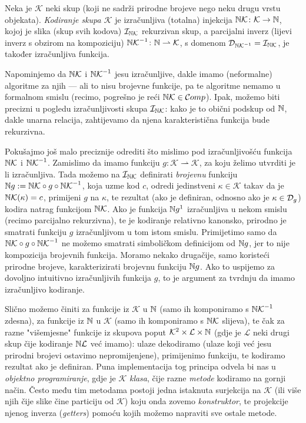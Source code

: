 \begin{definicija}
Neka je $\mathcal K$ neki skup (koji ne sadrži prirodne brojeve nego neku drugu vrstu objekata). \emph{Kodiranje skupa $\mathcal K$} je izračunljiva (totalna) injekcija ${\mathbb N}\mathcal K\colon\mathcal K\to{\mathbb N}$, kojoj je slika (skup svih kodova) $\mathcal I_{{\mathbb N}\mathcal K}$ rekurzivan skup, a parcijalni inverz (lijevi inverz s obzirom na kompoziciju) ${{\mathbb N}\mathcal K}^{-1}\colon{\mathbb N}\rightharpoonup\mathcal K$, s domenom $\mathcal D_{{{\mathbb N}\mathcal K}^{-1}}=\mathcal I_{{\mathbb N}\mathcal K}$, je također izračunljiva funkcija.
\end{definicija}

Napominjemo da ${{\mathbb N}\mathcal K}$ i ${{\mathbb N}\mathcal K}^{-1}$ jesu izračunljive, dakle imamo (neformalne) algoritme za njih --- ali to nisu brojevne funkcije, pa te algoritme nemamo u formalnom smislu (recimo, pogrešno je reći ${\mathbb N}\mathcal K\in\mathcal Comp$). Ipak, možemo biti precizni u pogledu izračunljivosti skupa $\mathcal I_{{\mathbb N}\mathcal K}$: kako je to obični podskup od ${\mathbb N}$, dakle unarna relacija, zahtijevamo da njena karakteristična funkcija bude rekurzivna.

Pokušajmo još malo preciznije odrediti što mislimo pod izračunljivošću funkcija ${{\mathbb N}\mathcal K}$ i ${{\mathbb N}\mathcal K}^{-1}$. Zamislimo da imamo funkciju $g\colon\mathcal K\rightharpoonup\mathcal K$, za koju želimo utvrditi je li izračunljiva. Tada možemo na $\mathcal I_{{\mathbb N}\mathcal K}$ definirati \emph{brojevnu} funkciju ${\mathbb N} g:={{\mathbb N}\mathcal K}\circ g\circ{{\mathbb N}\mathcal K}^{-1}$, koja uzme kod $c$, odredi jedinstveni $\kappa\in\mathcal K$ takav da je ${{\mathbb N}\mathcal K}(\kappa)=c$, primijeni $g$ na $\kappa$, te rezultat (ako je definiran, odnosno ako je $\kappa\in\mathcal D_{g}$) kodira natrag funkcijom ${{\mathbb N}\mathcal K}$. Ako je funkcija ${\mathbb N} g^1$ izračunljiva u nekom smislu (recimo parcijalno rekurzivna), te je kodiranje relativno kanonsko, prirodno je smatrati funkciju $g$ izračunljivom u tom istom smislu. Primijetimo samo da ${{\mathbb N}\mathcal K}\circ g\circ{{\mathbb N}\mathcal K}^{-1}$ ne možemo smatrati simboličkom definicijom od ${\mathbb N} g$, jer to nije kompozicija brojevnih funkcija. Moramo nekako drugačije, samo koristeći prirodne brojeve, karakterizirati brojevnu funkciju ${\mathbb N} g$. Ako to uspijemo za dovoljno intuitivno izračunljivih funkcija $g$, to je argument za tvrdnju da imamo izračunljivo kodiranje.

Slično možemo činiti za funkcije iz $\mathcal K$ u ${\mathbb N}$ (samo ih komponiramo s ${{\mathbb N}\mathcal K}^{-1}$ zdesna), za funkcije iz ${\mathbb N}$ u $\mathcal K$ (samo ih komponiramo s ${{\mathbb N}\mathcal K}$ slijeva), te čak za razne "višemjesne" funkcije iz skupova poput $\mathcal K^2\times \mathcal L\times{\mathbb N}$ (gdje je $\mathcal L$ neki drugi skup čije kodiranje ${\mathbb N}\mathcal L$ već imamo): ulaze dekodiramo (ulaze koji već jesu prirodni brojevi ostavimo nepromijenjene), primijenimo funkciju, te kodiramo rezultat ako je definiran. Puna implementacija tog principa odvela bi nas u \emph{objektno programiranje}, gdje je $\mathcal K$ \emph{klasa}, čije razne \emph{metode} kodiramo na gornji način. Često među tim metodama postoji jedna istaknuta surjekcija na $\mathcal K$ (ili više njih čije slike čine particiju od $\mathcal K$) koju onda zovemo \emph{konstruktor}, te projekcije njenog inverza (\emph{getters}) pomoću kojih možemo napraviti sve ostale metode.

